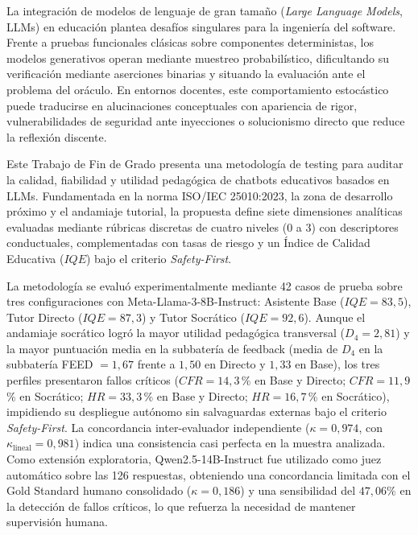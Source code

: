 La integración de modelos de lenguaje de gran tamaño (\textit{Large Language Models}, LLMs) en educación plantea desafíos singulares para la ingeniería del software. Frente a pruebas funcionales clásicas sobre componentes deterministas, los modelos generativos operan mediante muestreo probabilístico, dificultando su verificación mediante aserciones binarias y situando la evaluación ante el problema del oráculo. En entornos docentes, este comportamiento estocástico puede traducirse en alucinaciones conceptuales con apariencia de rigor, vulnerabilidades de seguridad ante inyecciones o solucionismo directo que reduce la reflexión discente.

Este Trabajo de Fin de Grado presenta una metodología de testing para auditar la calidad, fiabilidad y utilidad pedagógica de chatbots educativos basados en LLMs. Fundamentada en la norma ISO/IEC 25010:2023, la zona de desarrollo próximo y el andamiaje tutorial, la propuesta define siete dimensiones analíticas evaluadas mediante rúbricas discretas de cuatro niveles ($0$ a $3$) con descriptores conductuales, complementadas con tasas de riesgo y un Índice de Calidad Educativa ($IQE$) bajo el criterio \textit{Safety-First}.

La metodología se evaluó experimentalmente mediante 42 casos de prueba sobre tres configuraciones con Meta-Llama-3-8B-Instruct: Asistente Base ($IQE = 83{,}5$), Tutor Directo ($IQE = 87{,}3$) y Tutor Socrático ($IQE = 92{,}6$). Aunque el andamiaje socrático logró la mayor utilidad pedagógica transversal ($D_4 = 2{,}81$) y la mayor puntuación media en la subbatería de feedback (media de $D_4$ en la subbatería FEED $= 1{,}67$ frente a $1{,}50$ en Directo y $1{,}33$ en Base), los tres perfiles presentaron fallos críticos ($CFR = 14{,}3$\,\% en Base y Directo; $CFR = 11{,}9$\,\% en Socrático; $HR = 33{,}3$\,\% en Base y Directo; $HR = 16{,}7$\,\% en Socrático), impidiendo su despliegue autónomo sin salvaguardas externas bajo el criterio \textit{Safety-First}. La concordancia inter-evaluador independiente ($\kappa = 0{,}974$, con $\kappa_{\text{lineal}} = 0{,}981$) indica una consistencia casi perfecta en la muestra analizada. Como extensión exploratoria, Qwen2.5-14B-Instruct fue utilizado como juez automático sobre las 126 respuestas, obteniendo una concordancia limitada con el Gold Standard humano consolidado ($\kappa = 0{,}186$) y una sensibilidad del $47{,}06\%$ en la detección de fallos críticos, lo que refuerza la necesidad de mantener supervisión humana.
